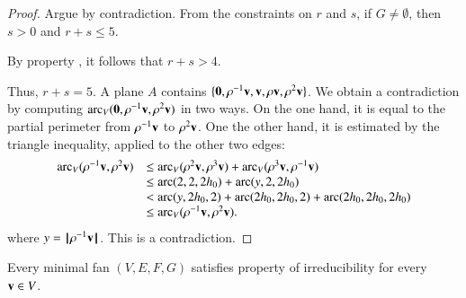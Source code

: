 \begin{proof}  Argue by contradiction.  From the constraints on $r$ and $s$, if $G\ne\emptyset$, then $s>0$ and $r+s\le 5$. 

By property , it follows that $r+s> 4$.

Thus, $r+s=5$.  A plane $A$ contains $\{{\mathbf 0},\rho^{-1}{\mathbf v},{\mathbf v},\rho{\mathbf v},\rho^2{\mathbf v}\}$. 
We obtain a contradiction by computing $\operatorname{arc}_V({\mathbf 0},\rho^{-1}{\mathbf v},\rho^2{\mathbf v})$ in two ways.  On the one hand, it is equal to the partial perimeter from $\rho^{-1}{\mathbf v}$ to $\rho^2 {\mathbf v}$.  One the other hand,
it is estimated by the triangle inequality, applied to the other two edges:
$$
\begin{array}{lll}
\operatorname{arc}_V(\rho^{-1}{\mathbf v},\rho^2{\mathbf v})
&\le\operatorname{arc}_V(\rho^2{\mathbf v},\rho^3{\mathbf v}) + \operatorname{arc}_V(\rho^3{\mathbf v},\rho^{-1}{\mathbf v}) \\
&\le\operatorname{arc}(2,2,2{h_0})+\operatorname{arc}(y,2,2{h_0})\\
&<\operatorname{arc}(y,2{h_0},2)+\operatorname{arc}(2{h_0},2{h_0},2) +\operatorname{arc}(2{h_0},2{h_0},2{h_0})\\
&\le\operatorname{arc}_V(\rho^{-1}{\mathbf v},\rho^2{\mathbf v}).
\end{array}
$$
where $y={{\hskip0.1em|\hskip-0.15em|\hskip0.1em}\rho^{-1} {\mathbf v}{\hskip0.1em|\hskip-0.15em|\hskip0.1em}}$.
This is a contradiction.
\end{proof}

\begin{lemma}
Every minimal fan $(V,E,F,G)$ satisfies property  of irreducibility for
every ${\mathbf v}\in V$.
\end{lemma}

